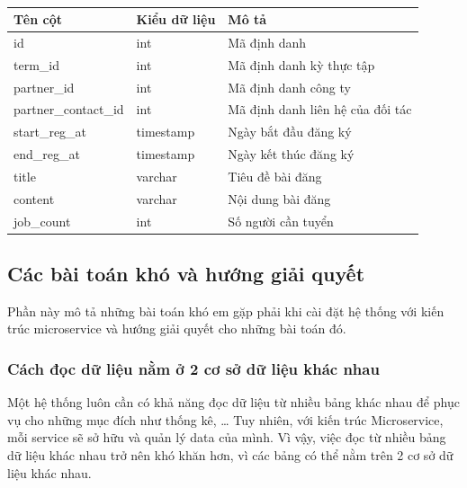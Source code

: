 \documentclass[./../main.tex]{subfiles}
\begin{document}
\begin{table}[H]
	\caption{}
	\label{tab:db_posts}
	\begin{tabular}{|l|l|l|}
	\hline
	\textbf{Tên cột}     & \textbf{Kiểu dữ liệu} & \textbf{Mô tả}                   \\ \hline
	id                   & int                   & Mã định danh                     \\ \hline
	term\_id             & int                   & Mã định danh kỳ thực tập         \\ \hline
	partner\_id          & int                   & Mã định danh công ty             \\ \hline
	partner\_contact\_id & int                   & Mã định danh liên hệ của đối tác \\ \hline
	start\_reg\_at       & timestamp             & Ngày bắt đầu đăng ký             \\ \hline
	end\_reg\_at         & timestamp             & Ngày kết thúc đăng ký            \\ \hline
	title                & varchar               & Tiêu đề bài đăng                 \\ \hline
	content              & varchar               & Nội dung bài đăng                \\ \hline
	job\_count           & int                   & Số người cần tuyển               \\ \hline
	\end{tabular}
\end{table}

\subsection{Các bài toán khó và hướng giải quyết}

Phần này mô tả những bài toán khó em gặp phải khi cài đặt hệ thống với
kiến trúc microservice và hướng giải quyết cho những bài toán đó.

\hypertarget{cuxe1ch-ux111ux1ecdc-dux1eef-liux1ec7u-nux1eb1m-ux1edf-2-cux1a1-sux1edf-dux1eef-liux1ec7u-khuxe1c-nhau}{%
\subsubsection{Cách đọc dữ liệu nằm ở 2 cơ sở dữ liệu khác
nhau}\label{cuxe1ch-ux111ux1ecdc-dux1eef-liux1ec7u-nux1eb1m-ux1edf-2-cux1a1-sux1edf-dux1eef-liux1ec7u-khuxe1c-nhau}}

Một hệ thống luôn cần có khả năng đọc dữ liệu từ nhiều bảng khác nhau để
phục vụ cho những mục đích như thống kê, \ldots{} Tuy nhiên, với kiến
trúc Microservice, mỗi service sẽ sở hữu và quản lý data của mình. Vì
vậy, việc đọc từ nhiều bảng dữ liệu khác nhau trở nên khó khăn hơn, vì
các bảng có thể nằm trên 2 cơ sở dữ liệu khác nhau.
\end{document}
